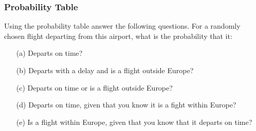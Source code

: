 \documentclass[IntroMain.tex]{subfiles}
\begin{document}
 

\begin{frame}
\frametitle{Probability Table}

Using the probability table answer the following questions.
\bigskip
For a randomly chosen flight departing from this airport, what is the probability that it: 
\begin{itemize}
\item[(a)] Departs on time? 
\item[(b)] Departs with a delay and is a flight outside Europe? 
\item[(c)] Departs on time or is a flight outside Europe? 
\item[(d)] Departs on time, given that you know it is a fight within Europe? 
\item[(e)] Is a flight within Europe, given that you know that it departs on time?
\end{itemize}
\end{frame}
\end{document}
